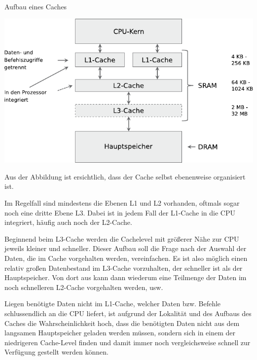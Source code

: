 \begin{bonus}{Aufbau eines Caches}
    \begin{center}
        \includegraphics[]{images/cache_aufbau.pdf}
    \end{center}

    Aus der Abbildung ist ersichtlich, dass der Cache selbst ebenenweise organisiert ist.

    Im Regelfall sind mindestens die Ebenen L1 und L2 vorhanden, oftmals sogar noch
    eine dritte Ebene L3. Dabei ist in jedem Fall der L1-Cache in die CPU integriert,
    häufig auch noch der L2-Cache.

    Beginnend beim
    L3-Cache werden die Cachelevel mit größerer Nähe zur CPU jeweils kleiner und
    schneller. Dieser Aufbau soll die Frage nach der Auswahl der Daten, die im Cache
    vorgehalten werden, vereinfachen. Es ist also möglich einen relativ großen Datenbestand
    im L3-Cache vorzuhalten, der schneller ist als der Hauptspeicher. Von dort
    aus kann dann wiederum eine Teilmenge der Daten im noch schnelleren L2-Cache
    vorgehalten werden, usw.

    Liegen benötigte Daten nicht im L1-Cache, welcher Daten bzw. Befehle schlussendlich an die CPU liefert, ist aufgrund der Lokalität und
    des Aufbaus des Caches die Wahrscheinlichkeit hoch, dass die benötigten Daten
    nicht aus dem langsamen Hauptspeicher geladen werden müssen, sondern sich in
    einem der niedrigeren Cache-Level finden und damit immer noch vergleichsweise
    schnell zur Verfügung gestellt werden können.
\end{bonus}

